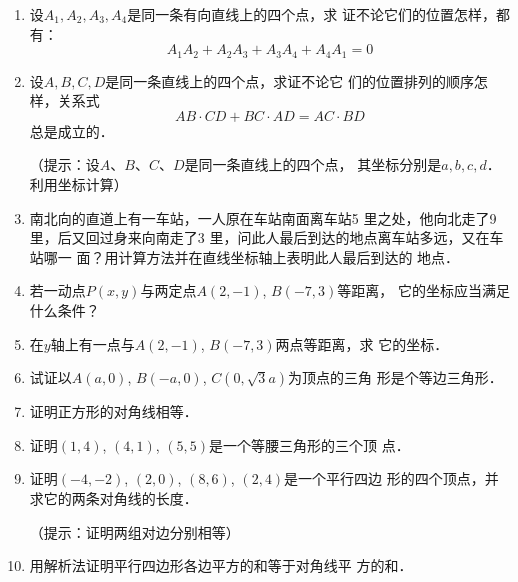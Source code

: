 \begin{enumerate}
    \item 设$A_1,A_2,A_3,A_4$是同一条有向直线上的四个点，求
证不论它们的位置怎样，都有：
\[A_1A_2+A_2A_3+A_3A_4+A_4A_1=0\]
\item 设$A,B,C,D$是同一条直线上的四个点，求证不论它
们的位置排列的顺序怎样，关系式
\[AB\cdot CD+BC\cdot AD=AC\cdot BD\]
总是成立的．

（提示：设$A$、$B$、$C$、$D$是同一条直线上的四个点，
其坐标分别是$a,b,c,d$．利用坐标计算）

\item 南北向的直道上有一车站，一人原在车站南面离车站5
里之处，他向北走了9里，后又回过身来向南走了3
里，问此人最后到达的地点离车站多远，又在车站哪一
面？用计算方法并在直线坐标轴上表明此人最后到达的
地点．
\item 若一动点$P(x,y)$与两定点$A(2,-1)$, $B(-7,3)$等距离，
它的坐标应当满足什么条件？
\item  在$y$轴上有一点与$A(2,-1)$, $B(-7,3)$两点等距离，求
它的坐标．
\item  试证以$A(a,0)$, $B(-a,0)$, $C(0,\sqrt{3}a)$为顶点的三角
形是个等边三角形．
\item 证明正方形的对角线相等．
\item  证明$(1,4)$, $(4,1)$, $(5,5)$是一个等腰三角形的三个顶
点．
\item  证明$(-4,-2)$, $(2,0)$, $(8,6)$, $(2,4)$是一个平行四边
形的四个顶点，并求它的两条对角线的长度．

（提示：证明两组对边分别相等）
\item 用解析法证明平行四边形各边平方的和等于对角线平
方的和．
\end{enumerate}

